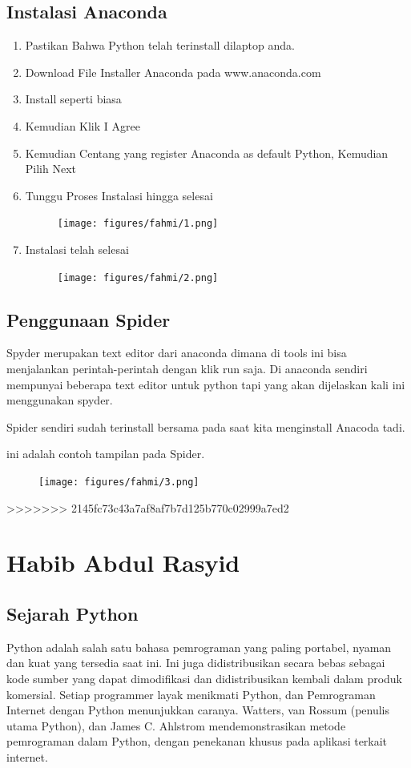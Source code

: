 \subsection{Instalasi Anaconda}
\begin{enumerate}
    \item Pastikan Bahwa Python telah terinstall dilaptop anda.
    \item Download File Installer Anaconda pada www.anaconda.com
    \item Install seperti biasa 
    \item Kemudian Klik I Agree
    \item Kemudian Centang yang register Anaconda as default Python, Kemudian Pilih Next
    \item Tunggu Proses Instalasi hingga selesai
    \begin{figure}[H]
		\texttt{[image: figures/fahmi/1.png]}
		\centering
	\end{figure}

    \item Instalasi telah selesai
	 \begin{figure}[H]
		\texttt{[image: figures/fahmi/2.png]}
		\centering
	\end{figure}
	
\end{enumerate}
	

\subsection{Penggunaan Spider}
Spyder merupakan text editor dari anaconda dimana di tools ini bisa menjalankan perintah-perintah dengan klik run saja. 
Di anaconda sendiri mempunyai beberapa text editor untuk python tapi yang akan dijelaskan kali ini menggunakan spyder.

Spider sendiri sudah terinstall bersama pada saat kita menginstall Anacoda tadi.

ini adalah contoh tampilan pada Spider.
\begin{figure}[H]
		\texttt{[image: figures/fahmi/3.png]}
		\centering
	\end{figure}
>>>>>>> 2145fc73c43a7af8af7b7d125b770c02999a7ed2

\section{Habib Abdul Rasyid}
\subsection{Sejarah Python}
Python adalah salah satu bahasa pemrograman yang paling portabel, nyaman dan kuat yang tersedia saat ini. Ini juga didistribusikan secara bebas sebagai kode sumber yang dapat dimodifikasi dan didistribusikan kembali dalam produk komersial. Setiap programmer layak menikmati Python, dan Pemrograman Internet dengan Python menunjukkan caranya. Watters, van Rossum (penulis utama Python), dan James C. Ahlstrom mendemonstrasikan metode pemrograman dalam Python, dengan penekanan khusus pada aplikasi terkait internet\cite{watters1996internet}.
\par
